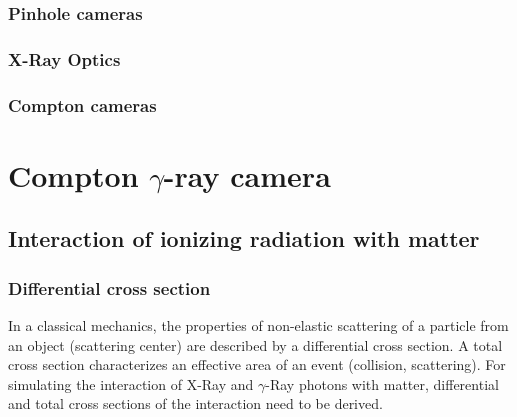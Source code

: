 \documentclass[a4paper,12pt,titlepage, twoside]{article}
\begin{document}


\subsubsection{Pinhole cameras}



\subsubsection{X-Ray Optics}



\subsubsection{Compton cameras}




\clearpage


\section{Compton $\gamma$-ray camera}


\subsection{Interaction of ionizing radiation with matter}


\subsubsection{Differential cross section}

In a classical mechanics, the properties of non-elastic scattering of a particle from an object (scattering center) are described by a differential cross section.
A total cross section characterizes an effective area of an event (collision, scattering).
For simulating the interaction of X-Ray and $\gamma$-Ray photons with matter, differential and total cross sections of the interaction need to be derived.
\end{document}
